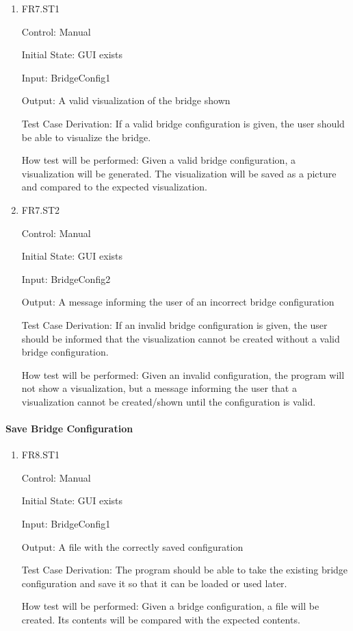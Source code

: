 \documentclass[12pt, titlepage]{article}
\begin{document}
\begin{enumerate}
  
  \item{FR7.ST1\\}
  
  Control: Manual
  
  Initial State: GUI exists
  
  Input: BridgeConfig1
  
  Output: A valid visualization of the bridge shown
  
  Test Case Derivation: If a valid bridge configuration is given, the user should be able to
  visualize the bridge.
  
  How test will be performed: Given a valid bridge configuration, a visualization will be generated.
  The visualization will be saved as a picture and compared to the expected visualization.
  
  \item{FR7.ST2\\}
  
  Control: Manual
  
  Initial State: GUI exists
  
  Input: BridgeConfig2
  
  Output: A message informing the user of an incorrect bridge configuration
  
  Test Case Derivation: If an invalid bridge configuration is given, the user should be informed
  that the visualization cannot be created without a valid bridge configuration.
  
  How test will be performed: Given an invalid configuration, the program will not show
  a visualization, but a message informing the user that a visualization cannot be created/shown
  until the configuration is valid.
  
\end{enumerate}

\paragraph{Save Bridge Configuration}

\begin{enumerate}

  \item{FR8.ST1\\}
  
  Control: Manual
  
  Initial State: GUI exists
  
  Input: BridgeConfig1
  
  Output: A file with the correctly saved configuration
  
  Test Case Derivation: The program should be able to take the existing bridge configuration and
  save it so that it can be loaded or used later.
  
  How test will be performed: Given a bridge configuration, a file will be created. Its contents
  will be compared with the expected contents.

\end{enumerate}
\end{document}
